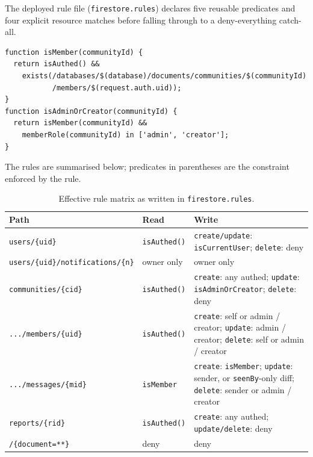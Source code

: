 \documentclass[11pt,a4paper]{article}
\renewcommand{\arraystretch}{1.05}
\begin{document}
The deployed rule file (\texttt{firestore.rules}) declares five reusable
predicates and four explicit resource matches before falling through to a
deny-everything catch-all.

\begin{lstlisting}[basicstyle=\ttfamily\scriptsize]
function isMember(communityId) {
  return isAuthed() &&
    exists(/databases/$(database)/documents/communities/$(communityId)
           /members/$(request.auth.uid));
}
function isAdminOrCreator(communityId) {
  return isMember(communityId) &&
    memberRole(communityId) in ['admin', 'creator'];
}
\end{lstlisting}

The rules are summarised below; predicates in parentheses are the
constraint enforced by the rule.

\begin{table}[h]
\centering\small
\renewcommand{\arraystretch}{1.1}
\begin{tabularx}{\linewidth}{@{}lXX@{}}
\toprule
\textbf{Path} & \textbf{Read} & \textbf{Write} \\
\midrule
\texttt{users/\{uid\}}                          & \texttt{isAuthed()} & \texttt{create/update}: \texttt{isCurrentUser}; \texttt{delete}: deny \\
\texttt{users/\{uid\}/notifications/\{n\}}      & owner only           & owner only \\
\texttt{communities/\{cid\}}                    & \texttt{isAuthed()}  & \texttt{create}: any authed; \texttt{update}: \texttt{isAdminOrCreator}; \texttt{delete}: deny \\
\texttt{.../members/\{uid\}}                    & \texttt{isAuthed()}  & \texttt{create}: self or admin / creator; \texttt{update}: admin / creator; \texttt{delete}: self or admin / creator \\
\texttt{.../messages/\{mid\}}                   & \texttt{isMember}    & \texttt{create}: \texttt{isMember}; \texttt{update}: sender, or \texttt{seenBy}-only diff; \texttt{delete}: sender or admin / creator \\
\texttt{reports/\{rid\}}                        & \texttt{isAuthed()}  & \texttt{create}: any authed; \texttt{update/delete}: deny \\
\texttt{/\{document=**\}}                       & deny                 & deny \\
\bottomrule
\end{tabularx}
\caption{Effective rule matrix as written in \texttt{firestore.rules}.}
\end{table}
\end{document}

